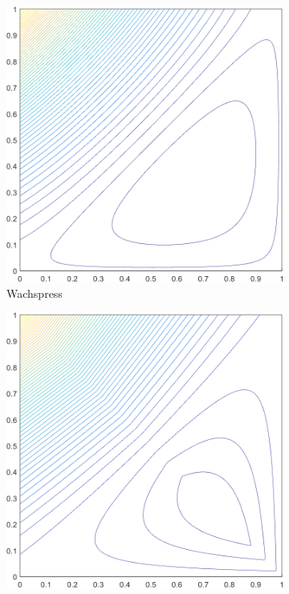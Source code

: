 \begin{figure}
\centering
	\begin{subfigure}[b]{0.39\textwidth}
		\centering
		\includegraphics[width=\textwidth]{figures/sec_BF/square_WACHSPRESS2_contour_b4.png}
		\caption{Wachspress}
	\end{subfigure}
	\hspace{1.5cm}
	\begin{subfigure}[b]{0.39\textwidth}
		\centering
		\includegraphics[width=\textwidth]{figures/sec_BF/square_PWLD2_contour_b4.png}

\end{subfigure}
\end{figure}
